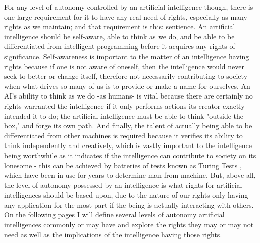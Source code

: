 For any level of autonomy controlled by an artificial intelligence though, there is one large requirement for it to have any real need of rights, especially as many rights as we maintain; and that requirement is this: sentience. An artificial intelligence should be self-aware, able to think as we do, and be able to be differentiated from intelligent programming before it acquires any rights of significance. Self-awareness is important to the matter of an intelligence having rights because if one is not aware of oneself, then the intelligence would never seek to better or change itself, therefore not necessarily contributing to society when what drives so many of us is to provide or make a name for ourselves. An AI's ability to think as we do -as humans- is vital because there are certainly no rights warranted the intelligence if it only performs actions its creator exactly intended it to do; the artificial intelligence must be able to think "outside the box," and forge its own path. And finally, the talent of actually being able to be differentiated from other machines is required because it verifies its ability to think independently and creatively, which is vastly important to the intelligence being worthwhile as it indicates if the intelligence can contribute to society on its lonesome - this can be achieved by batteries of tests known as Turing Tests \cite{sep-turing-test}, which have been in use for years to determine man from machine. But, above all, the level of autonomy possessed by an intelligence is what rights for artificial intelligences should be based upon, due to the nature of our rights only having any application for the most part if the being is actually interacting with others. On the following pages I will define several levels of autonomy artificial intelligences commonly or may have and explore the rights they may or may not need as well as the implications of the intelligence having those rights.
